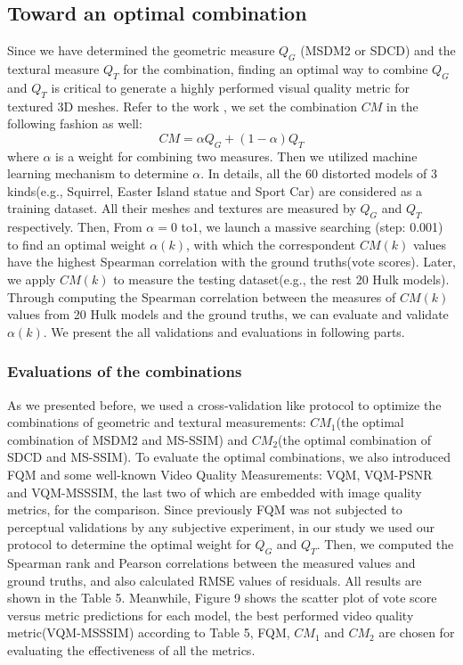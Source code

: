 \subsection{Toward an optimal combination}
Since we have determined the geometric measure $Q_G$ (MSDM2 or SDCD) and the textural measure $Q_T$ for the combination, finding an optimal way to combine $Q_G$ and $Q_T$ is critical to generate a highly performed visual quality metric for textured 3D meshes. Refer to the work \cite{Tian_2004} , we set the combination $CM$ in the following fashion as well:
\begin{equation}
CM = \alpha Q_G +(1-\alpha) Q_T
\end{equation}
where $\alpha$ is a weight for combining two measures. Then we utilized machine learning mechanism to determine $\alpha$. In details,  all the 60 distorted models of 3 kinds(e.g., Squirrel, Easter Island statue and Sport Car) are considered as a training dataset. All their meshes and textures are measured by $Q_G$ and $Q_T$ respectively. Then, From $\alpha =0$ to$1$, we launch a massive searching (step: 0.001) to find an optimal weight $\alpha(k)$, with which the correspondent $CM(k)$ values have the highest Spearman correlation with the ground truths(vote scores). Later, we apply $CM(k)$ to measure the testing dataset(e.g., the rest 20 Hulk models). Through computing the Spearman correlation between the measures of $CM(k)$ values from 20 Hulk models and the ground truths, we can evaluate and validate $\alpha(k)$. We present the all validations and evaluations in following parts.\\
\subsubsection{Evaluations of the combinations}
As we presented before, we used a cross-validation like protocol to optimize the combinations of geometric and textural measurements: $CM_1$(the optimal combination of MSDM2 and MS-SSIM) and $CM_2$(the optimal combination of SDCD and MS-SSIM). To evaluate the optimal combinations, we also introduced FQM and some well-known Video Quality Measurements: VQM, VQM-PSNR and VQM-MSSSIM, the last two of which are embedded with image quality metrics, for the comparison. Since previously FQM was not subjected to perceptual validations by any subjective experiment, in our study we used our protocol to determine the optimal weight for $Q_G$ and $Q_T$. Then, we computed the Spearman rank and Pearson correlations between the measured values and ground truths, and also calculated RMSE values of residuals. All results are shown in the Table 5. Meanwhile, Figure 9 shows the scatter plot of vote score versus metric predictions for each model, the best performed video quality metric(VQM-MSSSIM) according to Table 5, FQM, $CM_1$ and $CM_2$ are chosen for evaluating the effectiveness of all the metrics.\\


